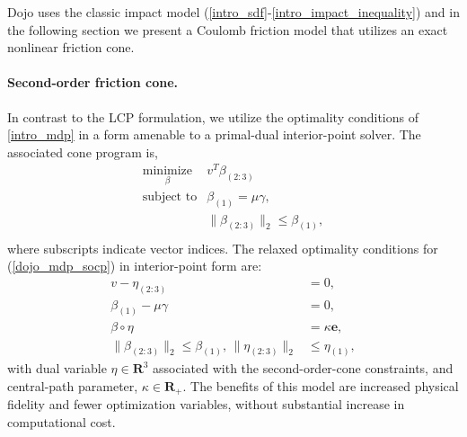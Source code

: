 Dojo uses the classic impact model (\ref{intro_sdf}-\ref{intro_impact_inequality}) and in the following section we present a Coulomb friction model that utilizes an exact nonlinear friction cone.

\paragraph{Second-order friction cone.}
In contrast to the LCP formulation, we utilize the optimality conditions of \eqref{intro_mdp} in a form amenable to a primal-dual interior-point solver. The associated cone program is,
\begin{equation}
	\begin{array}{ll}
		\underset{\beta}{\mbox{minimize}} & v^T \beta_{(2:3)}\\
		\mbox{subject to} & \beta_{(1)} = \mu \gamma, \\
		& \|\beta_{(2:3)}\|_2 \leq \beta_{(1)},\\
	\end{array} \label{dojo_mdp_socp}
\end{equation}
where subscripts indicate vector indices.
The relaxed optimality conditions for (\ref{dojo_mdp_socp}) in interior-point form are: 
\begin{align}
	v - \eta_{(2:3)} &= 0, \\
	\beta_{(1)} - \mu \gamma &= 0, \\
	\beta \circ \eta &=  \kappa \mathbf{e}, \\
	\|\beta_{(2:3)}\|_2 \leq \beta_{(1)}, \, \|\eta_{(2:3)}\|_2 &\leq \eta_{(1)}, 
	\label{socp_mdp_constraints}
\end{align}
with dual variable $\eta \in \mathbf{R}^3$ associated with the second-order-cone constraints, and central-path parameter, $\kappa \in \mathbf{R}_{+}$. The benefits of this model are increased physical fidelity and fewer optimization variables, without substantial increase in computational cost.

